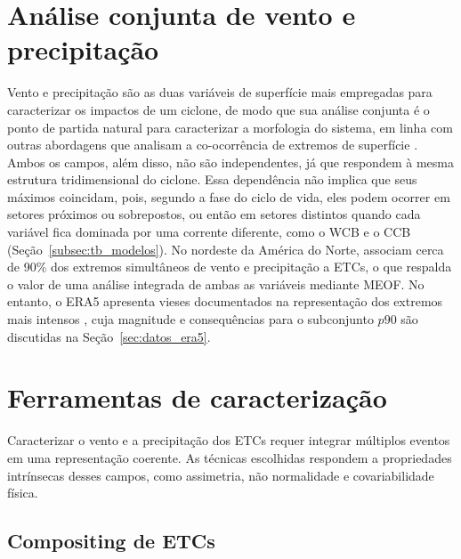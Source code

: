 \section{Análise conjunta de vento e precipitação}\label{sec:tb_compound_def}
Vento e precipitação são as duas variáveis de superfície mais empregadas para caracterizar os impactos de um ciclone, de modo que sua análise conjunta é o ponto de partida natural para caracterizar a morfologia do sistema, em linha com outras abordagens que analisam a co-ocorrência de extremos de superfície \citep{zscheischler2018future}.
Ambos os campos, além disso, não são independentes, já que respondem à mesma estrutura tridimensional do ciclone.
Essa dependência não implica que seus máximos coincidam, pois, segundo a fase do ciclo de vida, eles podem ocorrer em setores próximos ou sobrepostos, ou então em setores distintos quando cada variável fica dominada por uma corrente diferente, como o WCB e o CCB (Seção~\ref{subsec:tb_modelos}).
No nordeste da América do Norte, \citet{chen2025characteristics} associam cerca de 90\% dos extremos simultâneos de vento e precipitação a ETCs, o que respalda o valor de uma análise integrada de ambas as variáveis mediante MEOF.
No entanto, o ERA5 apresenta vieses documentados na representação dos extremos mais intensos \citep{chen2024evaluation}, cuja magnitude e consequências para o subconjunto $p90$ são discutidas na Seção~\ref{sec:datos_era5}.

\section{Ferramentas de caracterização}\label{sec:tb_herramientas}
Caracterizar o vento e a precipitação dos ETCs requer integrar múltiplos eventos em uma representação coerente.
As técnicas escolhidas respondem a propriedades intrínsecas desses campos, como assimetria, não normalidade e covariabilidade física.

\subsection{Compositing de ETCs}\label{subsec:tb_compositing}

